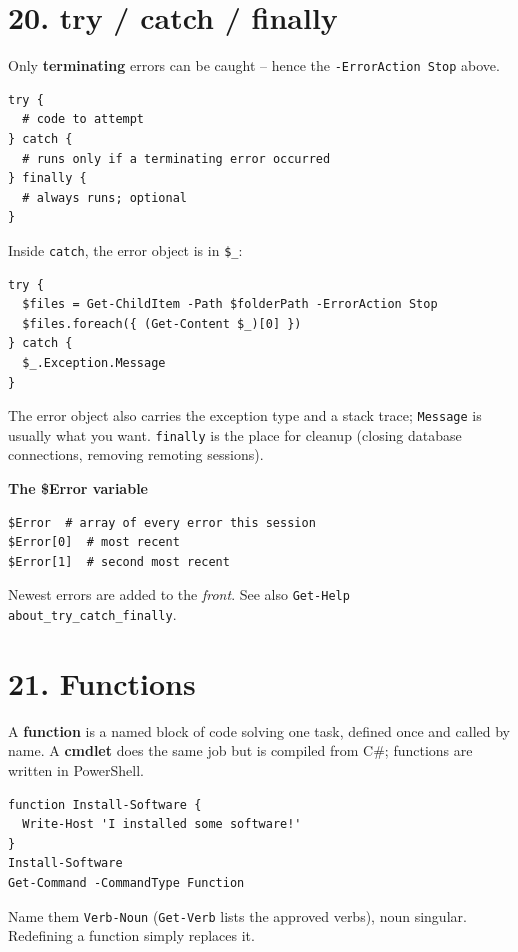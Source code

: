 \section{20. try / catch / finally}
Only \textbf{terminating} errors can be caught -- hence the \texttt{-ErrorAction Stop} above.
\begin{verbatim}
try {
  # code to attempt
} catch {
  # runs only if a terminating error occurred
} finally {
  # always runs; optional
}
\end{verbatim}
Inside \texttt{catch}, the error object is in \texttt{\$\_}:
\begin{verbatim}
try {
  $files = Get-ChildItem -Path $folderPath -ErrorAction Stop
  $files.foreach({ (Get-Content $_)[0] })
} catch {
  $_.Exception.Message
}
\end{verbatim}
The error object also carries the exception type and a stack trace; \texttt{Message} is usually what you want. \texttt{finally} is the place for cleanup (closing database connections, removing remoting sessions).

\textbf{The \$Error variable}

\begin{verbatim}
$Error  # array of every error this session
$Error[0]  # most recent
$Error[1]  # second most recent
\end{verbatim}
Newest errors are added to the \emph{front}. See also \texttt{Get-Help about\_try\_catch\_finally}.

\section{21. Functions}
A \textbf{function} is a named block of code solving one task, defined once and called by name. A \textbf{cmdlet} does the same job but is compiled from C\#; functions are written in PowerShell.
\begin{verbatim}
function Install-Software {
  Write-Host 'I installed some software!'
}
Install-Software
Get-Command -CommandType Function
\end{verbatim}
Name them \texttt{Verb-Noun} (\texttt{Get-Verb} lists the approved verbs), noun singular. Redefining a function simply replaces it.

